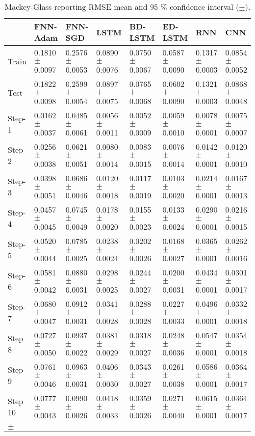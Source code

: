 \documentclass{ieeeaccess}
\begin{document}
\begin{table*}[htbp]
\smaller 
\caption{Mackey-Glass reporting RMSE mean and 95 \% confidence interval   ($\pm$).}
\label{tab:mackey}
\begin{tabular}{llllllll}
\hline
 &  FNN-Adam& FNN-SGD & LSTM & BD-LSTM  & ED-LSTM & RNN & CNN\\
				
\hline
\hline
Train &      
0.1810$\pm$	0.0097&
0.2576$\pm$	0.0053&
0.0890$\pm$	0.0076&
0.0750$\pm$	0.0067&
0.0587$\pm$	0.0090&
0.1317$\pm$	0.0003& 0.0854$\pm$		0.0052\\
Test &      
0.1822$\pm$	0.0098&
0.2599$\pm$	0.0054&
0.0897$\pm$	0.0075&
0.0765$\pm$	0.0068&
0.0602$\pm$	0.0090&
0.1321$\pm$	0.0003&0.0868$\pm$		0.0048\\
Step-1 &      
0.0162$\pm$	0.0037&
0.0485$\pm$	0.0061&
0.0056$\pm$	0.0011&
0.0052$\pm$	0.0009&
0.0059$\pm$	0.0010&
0.0078$\pm$	0.0001&	0.0075$\pm$		0.0007\\
Step-2 &      
0.0256$\pm$	0.0038&
0.0621$\pm$	0.0051&
0.0080$\pm$	0.0014&
0.0083$\pm$	0.0015&
0.0076$\pm$	0.0014&
0.0142$\pm$	0.0001&0.0120$\pm$		0.0010\\
Step-3 &      
0.0398$\pm$	0.0051&
0.0686$\pm$	0.0046&
0.0120$\pm$	0.0018&
0.0117$\pm$	0.0019&
0.0103$\pm$	0.0020&
0.0214$\pm$	0.0001&	0.0167$\pm$		0.0013\\
Step-4 &      
0.0457$\pm$	0.0045&
0.0745$\pm$	0.0049&
0.0178$\pm$	0.0020&
0.0155$\pm$	0.0023&
0.0133$\pm$	0.0024&
0.0290$\pm$	0.0001&0.0216$\pm$		0.0015\\
Step-5 &      
0.0520$\pm$	0.0044&
0.0785$\pm$	0.0025&
0.0238$\pm$	0.0024&
0.0202$\pm$	0.0026&
0.0168$\pm$	0.0027&
0.0365$\pm$	0.0001&	0.0262$\pm$		0.0016\\
Step-6 &      
0.0581$\pm$	0.0042&
0.0880$\pm$	0.0031&
0.0298$\pm$	0.0025&
0.0244$\pm$	0.0027&
0.0200$\pm$	0.0031&
0.0434$\pm$	0.0001&0.0301$\pm$		0.0017\\
Step-7 &      
0.0680$\pm$	0.0047&
0.0912$\pm$	0.0031&
0.0341$\pm$	0.0028&
0.0288$\pm$	0.0028&
0.0227$\pm$	0.0033&
0.0496$\pm$	0.0001&	0.0332$\pm$		0.0018\\
Step 8 &      
0.0727$\pm$	0.0050&
0.0937$\pm$	0.0022&
0.0381$\pm$	0.0029&
0.0318$\pm$	0.0027&
0.0248$\pm$	0.0036&
0.0547$\pm$	0.0001&	0.0354$\pm$		0.0018\\
Step 9 &      
0.0761$\pm$	0.0046&
0.0963$\pm$	0.0031&
0.0406$\pm$	0.0030&
0.0343$\pm$	0.0027&
0.0261$\pm$	0.0038&
0.0586$\pm$	0.0001&	0.0364$\pm$		0.0017\\
Step 10 &      
0.0777$\pm$	0.0043&
0.0990$\pm$	0.0026&
0.0418$\pm$	0.0033&
0.0359$\pm$	0.0026&
0.0271$\pm$	0.0040&
0.0615$\pm$	0.0001&	0.0364$\pm$		0.0017\\
\hline
 $\pm$&
\end{tabular}

\end{table*}
\end{document}
